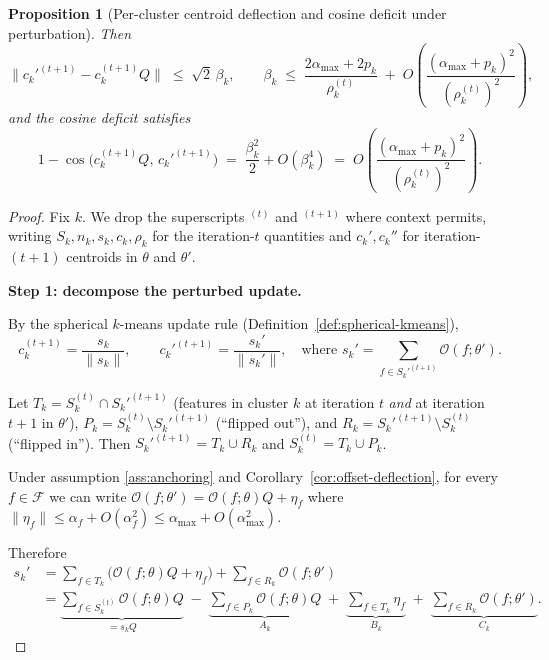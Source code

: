 \documentclass[11pt,letterpaper]{article}
\newtheorem{proposition}[theorem]{Proposition}
\theoremstyle{definition}
\DeclareMathOperator{\cossim}{cos}
\begin{document}
\begin{proposition}[Per-cluster centroid deflection and cosine deficit under perturbation]
Then
\begin{equation}
\big\| c_k'^{(t+1)} - c_k^{(t+1)} Q \big\| \;\leq\; \sqrt{2}\, \beta_k, \qquad
\beta_k \;\leq\; \frac{2 \alpha_{\max} + 2 p_k}{\rho_k^{(t)}} \;+\; O\!\left( \frac{(\alpha_{\max} + p_k)^2}{(\rho_k^{(t)})^2} \right),
\label{eq:centroid-angle}
\end{equation}
and the cosine deficit satisfies
\begin{equation}
1 - \cossim\!\big( c_k^{(t+1)} Q, \, c_k'^{(t+1)} \big) \;=\; \frac{\beta_k^2}{2} + O(\beta_k^4) \;=\; O\!\left( \frac{(\alpha_{\max} + p_k)^2}{(\rho_k^{(t)})^2} \right).
\label{eq:centroid-deficit}
\end{equation}
\end{proposition}

\begin{proof}
Fix $k$. We drop the superscripts $^{(t)}$ and $^{(t+1)}$ where context permits, writing $S_k, n_k, s_k, c_k, \rho_k$ for the iteration-$t$ quantities and $c_k', c_k''$ for iteration-$(t+1)$ centroids in $\theta$ and $\theta'$.

\textbf{Step 1: decompose the perturbed update.}

By the spherical $k$-means update rule (Definition~\ref{def:spherical-kmeans}),
\[
c_k^{(t+1)} = \frac{s_k}{\|s_k\|}, \qquad
c_k'^{(t+1)} = \frac{s_k'}{\|s_k'\|}, \quad \text{where } s_k' = \sum_{f \in S_k'^{(t+1)}} \mathcal{O}(f; \theta').
\]

Let $T_k = S_k^{(t)} \cap S_k'^{(t+1)}$ (features in cluster $k$ at iteration $t$ \emph{and} at iteration $t+1$ in $\theta'$), $P_k = S_k^{(t)} \setminus S_k'^{(t+1)}$ (``flipped out''), and $R_k = S_k'^{(t+1)} \setminus S_k^{(t)}$ (``flipped in''). Then $S_k'^{(t+1)} = T_k \cup R_k$ and $S_k^{(t)} = T_k \cup P_k$.

Under assumption \ref{ass:anchoring} and Corollary~\ref{cor:offset-deflection}, for every $f \in \mathcal{F}$ we can write $\mathcal{O}(f; \theta') = \mathcal{O}(f; \theta) Q + \eta_f$ where $\|\eta_f\| \leq \alpha_f + O(\alpha_f^2) \leq \alpha_{\max} + O(\alpha_{\max}^2)$.

Therefore
\begin{align*}
s_k' &= \sum_{f \in T_k} \big( \mathcal{O}(f; \theta) Q + \eta_f \big) + \sum_{f \in R_k} \mathcal{O}(f; \theta') \\
&= \underbrace{\sum_{f \in S_k^{(t)}} \mathcal{O}(f; \theta) Q}_{= s_k Q} \;-\; \underbrace{\sum_{f \in P_k} \mathcal{O}(f; \theta) Q}_{A_k} \;+\; \underbrace{\sum_{f \in T_k} \eta_f}_{B_k} \;+\; \underbrace{\sum_{f \in R_k} \mathcal{O}(f; \theta')}_{C_k}.
\end{align*}


\end{proof}
\end{document}
